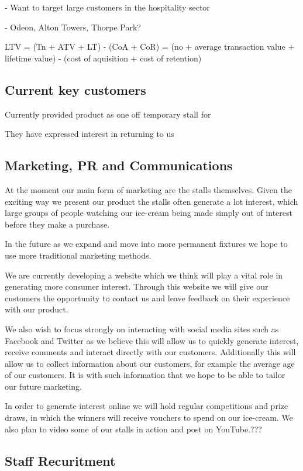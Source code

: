 \documentclass{article}
\begin{document}
 - Want to target large customers in the hospitality sector

 - Odeon, Alton Towers, Thorpe Park?

   LTV = (Tn + ATV + LT) - (CoA + CoR)
       = (no + average transaction value + lifetime value) - (cost of aquisition + cost of retention) 

  \subsection{Current key customers}

  Currently provided product as one off temporary stall for 

  They have expressed interest in returning to us

  \subsection{Marketing, PR and Communications}
  At the moment our main form of marketing are the stalls themselves. Given the exciting way we present our product the stalls often generate a lot interest, which large groups of people watching our ice-cream being made simply out of interest before they make a purchase.

  In the future as we expand and move into more permanent fixtures we hope to use more traditional marketing methods.

  We are currently developing a website which we think will play a vital role in generating more consumer interest. Through this website we will give our customers the opportunity to contact us and leave feedback on their experience with our product.

  We also wish to focus strongly on interacting with social media sites such as Facebook and Twitter as we believe this will allow us to quickly generate interest, receive comments and interact directly with our customers. Additionally this will allow us to collect information about our customers, for example the average age of our customers. It is with such information that we hope to be able to tailor our future marketing.

  In order to generate interest online we will hold regular competitions and prize draws, in which the winners will receive vouchers to spend on our ice-cream. We also plan to video some of our stalls in action and post on YouTube.???

  \subsection{Staff Recuritment}
\end{document}
